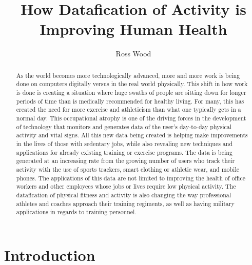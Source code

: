 \documentclass[sigconf]{acmart}
\begin{document}
\title{How Datafication of Activity is Improving Human Health}


\author{Ross Wood}

\begin{abstract}
As the world becomes more technologically advanced, more and more work is being done on computers digitally versus in the real world physically. This shift in how work is done is creating a situation where huge swaths of people are sitting down for longer periods of time than is medically recommended for healthy living. For many, this has created the need for more exercise and athleticism than what one typically gets in a normal day. This occupational atrophy is one of the driving forces in the development of technology that monitors and generates data of the user's day-to-day physical activity and vital signs. All this new data being created is helping make improvements in the lives of those with sedentary jobs, while also revealing new techniques and applications for already existing training or exercise programs. The data is being generated at an increasing rate from the growing number of users who track their activity with the use of sports trackers, smart clothing or athletic wear, and mobile phones. The applications of this data are not limited to improving the health of office workers and other employees whose jobs or lives require low physical activity. The datafication of physical fitness and activity is also changing the way professional athletes and coaches approach their training regiments, as well as having military applications in regards to training personnel.
\end{abstract}



\maketitle



\section{Introduction}
\end{document}
